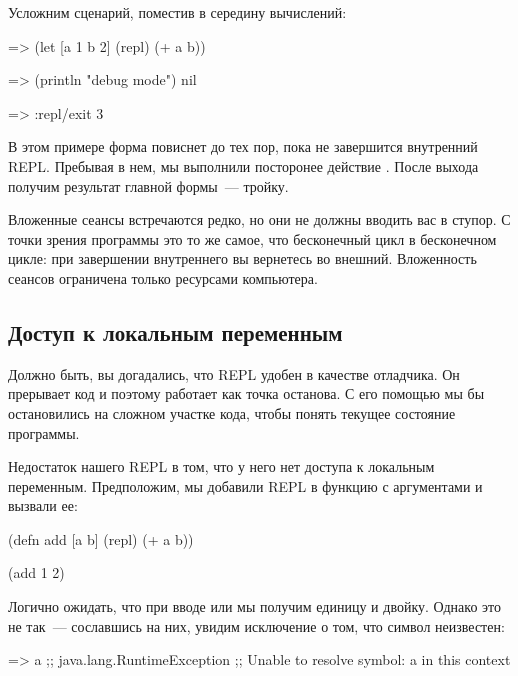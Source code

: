 Усложним сценарий, поместив  в середину вычислений:

\begin{english}
  \begin{clojure/lines}
=> (let [a 1 b 2] (repl) (+ a b))

=> (println "debug mode")
nil

=> :repl/exit
3
  \end{clojure/lines}
\end{english}

В этом примере форма  повиснет до тех пор, пока не завершится внутренний REPL. Пребывая в нем, мы выполнили посторонее действие . После выхода получим результат главной формы~--- тройку.

Вложенные сеансы встречаются редко, но они не должны вводить вас в ступор. С точки зрения программы это то же самое, что бесконечный цикл в бесконечном цикле: при завершении внутреннего вы вернетесь во внешний. Вложенность сеансов ограничена только ресурсами компьютера.

\subsection{Доступ к локальным переменным}


Должно быть, вы догадались, что REPL удобен в качестве отладчика. Он прерывает код и поэтому работает как точка останова. С его помощью мы бы остановились на сложном участке кода, чтобы понять текущее состояние программы.

Недостаток нашего REPL в том, что у него нет доступа к локальным переменным. Предположим, мы добавили REPL в функцию с аргументами и вызвали ее:

\begin{english}
  \begin{clojure}
(defn add [a b]
  (repl)
  (+ a b))

(add 1 2)
  \end{clojure}
\end{english}

Логично ожидать, что при вводе  или  мы получим единицу и двойку. Однако это не так~--- сославшись на них, увидим исключение о том, что символ неизвестен:

\begin{english}
  \begin{clojure}
=> a
;; java.lang.RuntimeException
;; Unable to resolve symbol: a in this context
  \end{clojure}
\end{english}

